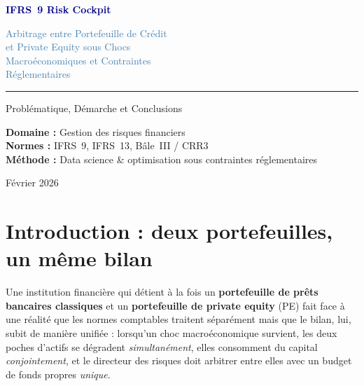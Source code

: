 \documentclass[12pt,a4paper]{article}
\begin{document}
\begin{titlepage}
\centering
\vspace*{2cm}

{\Huge\bfseries\textcolor{darkblue}{IFRS~9 Risk Cockpit}}

\vspace{1cm}
{\LARGE\textcolor{steelblue}{Arbitrage entre Portefeuille de Crédit\\et Private Equity sous Chocs\\Macroéconomiques et Contraintes\\Réglementaires}}

\vspace{2cm}

\rule{0.6\textwidth}{1pt}

\vspace{1.5cm}

{\Large Problématique, Démarche et Conclusions}

\vspace{2cm}

{\large
\textbf{Domaine :} Gestion des risques financiers\\[0.5em]
\textbf{Normes :} IFRS~9, IFRS~13, Bâle~III / CRR3\\[0.5em]
\textbf{Méthode :} Data science \& optimisation sous contraintes réglementaires
}

\vfill

{\small Février 2026}

\end{titlepage}

\tableofcontents
\newpage

\section{Introduction : deux portefeuilles, un même bilan}

Une institution financière qui détient à la fois un \textbf{portefeuille de prêts bancaires classiques} et un \textbf{portefeuille de private equity} (PE) fait face à une réalité que les normes comptables traitent séparément mais que le bilan, lui, subit de manière unifiée : lorsqu'un choc macroéconomique survient, les deux poches d'actifs se dégradent \textit{simultanément}, elles consomment du capital \textit{conjointement}, et le directeur des risques doit arbitrer entre elles avec un budget de fonds propres \textit{unique}.
\end{document}
